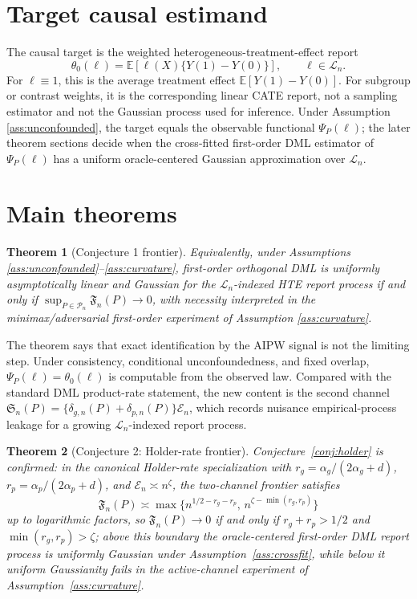 \documentclass[11pt]{article}
\newcommand{\E}{\mathbb{E}}
\theoremstyle{definition}
\theoremstyle{plain}
\newtheorem{theorem}{Theorem}
\theoremstyle{remark}
\begin{document}
\section{Target causal estimand}
The causal target is the weighted heterogeneous-treatment-effect report
\[
\theta_0(\ell)=\E[\ell(X)\{Y(1)-Y(0)\}],\qquad \ell\in\mathcal{L}_n.
\]
For \(\ell\equiv1\), this is the average treatment effect
\(\E[Y(1)-Y(0)]\).  For subgroup or contrast weights, it is the corresponding
linear CATE report, not a sampling estimator and not the Gaussian process used
for inference.  Under Assumption \ref{ass:unconfounded}, the target equals the
observable functional \(\Psi_P(\ell)\); the later theorem sections decide when
the cross-fitted first-order DML estimator of \(\Psi_P(\ell)\) has a uniform
oracle-centered Gaussian approximation over \(\mathcal{L}_n\).

\section{Main theorems}
\begin{theorem}[Conjecture 1 frontier]\label{thm:frontier}
Equivalently, under Assumptions \ref{ass:unconfounded}--\ref{ass:curvature}, first-order orthogonal DML is uniformly asymptotically linear and Gaussian for the \(\mathcal{L}_n\)-indexed HTE report process if and only if \(\sup_{P\in\mathcal{P}_n}\mathfrak{F}_n(P)\to0\), with necessity interpreted in the minimax/adversarial first-order experiment of Assumption \ref{ass:curvature}.
\end{theorem}

The theorem says that exact identification by the AIPW signal is not the
limiting step.  Under consistency, conditional unconfoundedness, and fixed
overlap, \(\Psi_P(\ell)=\theta_0(\ell)\) is computable from the observed law.
Compared with the standard DML product-rate statement, the new content is the
second channel
\(\mathfrak{S}_n(P)=\{\delta_{g,n}(P)+\delta_{p,n}(P)\}\mathcal{E}_n\), which
records nuisance empirical-process leakage for a growing
\(\mathcal{L}_n\)-indexed report process.

\begin{theorem}[Conjecture 2: Holder-rate frontier]\label{thm:holder-frontier}
Conjecture~\ref{conj:holder} is confirmed: in the canonical Holder-rate specialization with \(r_g=\alpha_g/(2\alpha_g+d)\), \(r_p=\alpha_p/(2\alpha_p+d)\), and \(\mathcal{E}_n\asymp n^\zeta\), the two-channel frontier satisfies
\[
\mathfrak F_n(P)\asymp
\max\{n^{1/2-r_g-r_p},\,n^{\zeta-\min(r_g,r_p)}\}
\]
up to logarithmic factors, so \(\mathfrak F_n(P)\to0\) if and only if \(r_g+r_p>1/2\) and \(\min(r_g,r_p)>\zeta\); above this boundary the oracle-centered first-order DML report process is uniformly Gaussian under Assumption~\ref{ass:crossfit}, while below it uniform Gaussianity fails in the active-channel experiment of Assumption~\ref{ass:curvature}.
\end{theorem}
\end{document}
